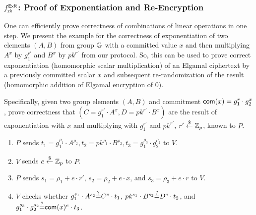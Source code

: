 \subsubsection{${f^{\mathsf{ExR}}_{\mathsf{zk}}}$: Proof of Exponentiation and Re-Encryption }
\label{pexr}
  One can
      efficiently prove correctness of combinations of linear operations  in one step. 
      We present the  
      example for the correctness of exponentiation of
      two elements $(A,B)$ from group $\mathbb{G}$ with a committed value $x$
      and then multiplying $A^x$ by $g_1^{r'}$ and $B^x$ by $pk^{r'}$ from our protocol. So, this
      can be used to prove correct exponentiation (homomorphic scalar multiplication) of an Elgamal ciphertext
      by a previously committed scalar  $x$ and subsequent re-randomization of
      the result (homomorphic addition of Elgamal encryption of $0$).

      Specifically, given two group elements $(A,B)$ and commitment
      $\mathsf{com}(x) =g_1^{r}\cdot{}g_2^x$, prove correctness that
      $(C=g_1^{r'}\cdot{}A^x,D=pk^{r'}\cdot{}B^x)$ are the result of
      exponentiation with $x$ and multiplying with $g_1^{r'}$ and
      $pk^{r'}$, $r'\stackrel{\$}{\leftarrow}\mathbb{Z}_p$, known to $P$.

\begin{enumerate}[leftmargin=*]
  \item $P$ sends $t_1=g_1^{\rho_1}\cdot{}A^{\rho_2},t_2=pk^{\rho_1}\cdot{}B^{\rho_2},t_3=g_1^{\rho_3}\cdot{}g_2^{\rho_2}$ to $V$.
  \item $V$ sends $e\stackrel{\$}{\leftarrow}\mathbb{Z}_p$ to $P$.
    \item $P$ sends $s_1=\rho_1+e\cdot{}r'$, $s_2=\rho_2+e\cdot{}x$,
      and $s_3=\rho_3+e\cdot{}r$ to $V$.
\item $V$ checks whether $g_1^{s_1}\cdot{}A^{s_2}{\stackrel{?}{=}}{}C^e\cdot{}t_1$,
  $pk^{s_1}\cdot{}B^{s_2}{\stackrel{?}{=}}{}D^e\cdot{}t_2$, and
  $g_1^{s_3}\cdot{}g_2^{s_2}{\stackrel{?}{=}}{}\mathsf{com}(x)^e\cdot{}t_3$.
\end{enumerate}

